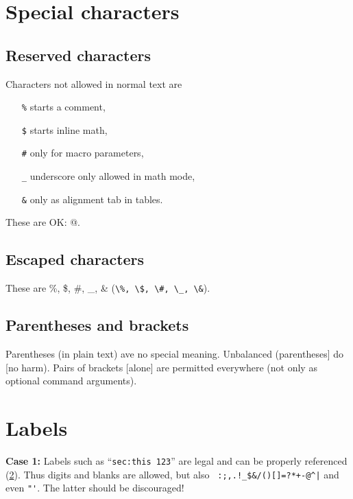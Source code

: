 \documentclass[a4paper]{article}
\begin{document}
\section{Special characters}

\subsection{Reserved characters}

Characters not allowed in normal text are  
\begin{itemize}\itemsep0pt
\item[\texttt{\%}] starts a comment,
\item[\texttt{\$}] starts inline math,
\item[\texttt{\#}] only for macro parameters,
\item[\texttt{\_}] underscore only allowed in math mode,
\item[\texttt{\&}] only as alignment tab in tables.
\end{itemize}
%
These are OK: @.


\subsection{Escaped characters}

These are \%, \$, \#, \_, \& (\verb!\%, \$, \#, \_, \&!).



\subsection{Parentheses and brackets}

Parentheses (in plain text) ave no special meaning.
Unbalanced (parentheses] do [no harm).
Pairs of brackets [alone] are permitted everywhere
(not only as optional command arguments).



\section{Labels}
\label{sec:this 123}
\label{a]bra}

\noindent\textbf{Case 1:}
Labels such as ``\verb!sec:this 123!'' are legal and can be properly referenced (\ref{sec:this 123}).
Thus digits and blanks are allowed, but also 
\verb*" :;,.!_$&/()[]=?*+-@^|"
and even
\verb*!"'!. The latter should be discouraged!
\end{document}
